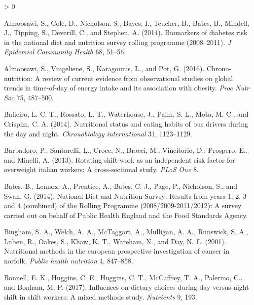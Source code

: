 \documentclass[utf8]{frontiersSCNS}
\newlength{\cslhangindent}
\newenvironment{CSLReferences}[2] %
 {%
  \setlength{\parindent}{0pt}
  \ifodd #1 \everypar{\setlength{\hangindent}{\cslhangindent}}\ignorespaces\fi
  \ifnum #2 > 0
  \setlength{\parskip}{#2\baselineskip}
  \fi
 }%
 {}
\begin{document}
\hypertarget{refs}{}
\begin{CSLReferences}{1}{0}
\leavevmode\hypertarget{ref-almoosawi2014biomarkers}{}%
Almoosawi, S., Cole, D., Nicholson, S., Bayes, I., Teucher, B., Bates,
B., Mindell, J., Tipping, S., Deverill, C., and Stephen, A. (2014).
Biomarkers of diabetes risk in the national diet and nutrition survey
rolling programme (2008--2011). \emph{J Epidemiol Community Health} 68,
51--56.

\leavevmode\hypertarget{ref-almoosawi2016chrono}{}%
Almoosawi, S., Vingeliene, S., Karagounis, L., and Pot, G. (2016).
Chrono-nutrition: A review of current evidence from observational
studies on global trends in time-of-day of energy intake and its
association with obesity. \emph{Proc Nutr Soc} 75, 487--500.

\leavevmode\hypertarget{ref-balieiro2014nutritional}{}%
Balieiro, L. C. T., Rossato, L. T., Waterhouse, J., Paim, S. L., Mota,
M. C., and Crispim, C. A. (2014). Nutritional status and eating habits
of bus drivers during the day and night. \emph{Chronobiology
international} 31, 1123--1129.

\leavevmode\hypertarget{ref-barbadoro2013rotating}{}%
Barbadoro, P., Santarelli, L., Croce, N., Bracci, M., Vincitorio, D.,
Prospero, E., and Minelli, A. (2013). Rotating shift-work as an
independent risk factor for overweight italian workers: A
cross-sectional study. \emph{PLoS One} 8.

\leavevmode\hypertarget{ref-bates2014national}{}%
Bates, B., Lennox, A., Prentice, A., Bates, C. J., Page, P., Nicholson,
S., and Swan, G. (2014). National {D}iet and {N}utrition {S}urvey:
Results from years 1, 2, 3 and 4 (combined) of the {R}olling {P}rogramme
(2008/2009-2011/2012): A survey carried out on behalf of {P}ublic
{H}ealth {E}ngland and the {F}ood {S}tandards {A}gency.

\leavevmode\hypertarget{ref-bingham2001nutritional}{}%
Bingham, S. A., Welch, A. A., McTaggart, A., Mulligan, A. A., Runswick,
S. A., Luben, R., Oakes, S., Khaw, K. T., Wareham, N., and Day, N. E.
(2001). Nutritional methods in the european prospective investigation of
cancer in norfolk. \emph{Public health nutrition} 4, 847--858.

\leavevmode\hypertarget{ref-bonnell2017influences}{}%
Bonnell, E. K., Huggins, C. E., Huggins, C. T., McCaffrey, T. A.,
Palermo, C., and Bonham, M. P. (2017). Influences on dietary choices
during day versus night shift in shift workers: A mixed methods study.
\emph{Nutrients} 9, 193.


\end{CSLReferences}
\end{document}

